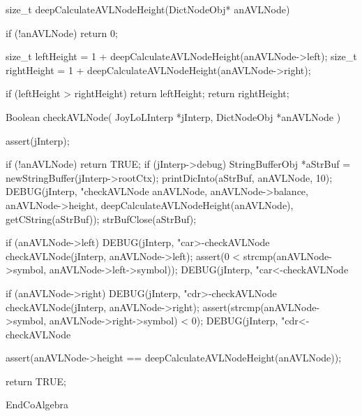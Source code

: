 size_t deepCalculateAVLNodeHeight(DictNodeObj* anAVLNode) {
  if (!anAVLNode) return 0;

  size_t leftHeight = 1 + deepCalculateAVLNodeHeight(anAVLNode->left);
  size_t rightHeight = 1 + deepCalculateAVLNodeHeight(anAVLNode->right);

  if (leftHeight > rightHeight) return leftHeight;
  return rightHeight;
}

Boolean checkAVLNode(
  JoyLoLInterp *jInterp,
  DictNodeObj  *anAVLNode
) {
  assert(jInterp);
 
  if (!anAVLNode) return TRUE;
  if (jInterp->debug) {
    StringBufferObj *aStrBuf =
      newStringBuffer(jInterp->rootCtx);
    printDicInto(aStrBuf, anAVLNode, 10);
    DEBUG(jInterp, "checkAVLNode %
          anAVLNode, anAVLNode->balance, anAVLNode->height,
          deepCalculateAVLNodeHeight(anAVLNode),
          getCString(aStrBuf));
    strBufClose(aStrBuf);
  }

  if (anAVLNode->left) {
      DEBUG(jInterp, "car>-checkAVLNode %
      checkAVLNode(jInterp, anAVLNode->left);
      assert(0 < strcmp(anAVLNode->symbol,
                      anAVLNode->left->symbol));
    DEBUG(jInterp, "car<-checkAVLNode %
  }

  if (anAVLNode->right) {
    DEBUG(jInterp, "cdr>-checkAVLNode %
    checkAVLNode(jInterp, anAVLNode->right);
    assert(strcmp(anAVLNode->symbol,
                  anAVLNode->right->symbol) < 0);
    DEBUG(jInterp, "cdr<-checkAVLNode %
  }

  assert(anAVLNode->height == deepCalculateAVLNodeHeight(anAVLNode));

  return TRUE;
}

EndCoAlgebra
\stopJoylolCode
